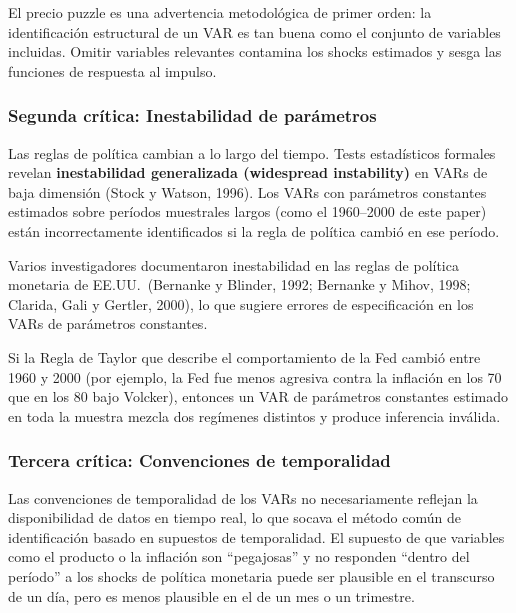 \documentclass[12pt]{article}
\begin{document}
\begin{hallazgo}
El precio puzzle es una advertencia metodol\'ogica de primer orden: la identificaci\'on estructural de un VAR es tan buena como el conjunto de variables incluidas. Omitir variables relevantes contamina los shocks estimados y sesga las funciones de respuesta al impulso.
\end{hallazgo}

\subsubsection{Segunda cr\'itica: Inestabilidad de par\'ametros}

Las reglas de pol\'itica cambian a lo largo del tiempo. Tests estad\'isticos formales revelan \textbf{inestabilidad generalizada (widespread instability)} en VARs de baja dimensi\'on (Stock y Watson, 1996). Los VARs con par\'ametros constantes estimados sobre per\'iodos muestrales largos (como el 1960--2000 de este paper) est\'an incorrectamente identificados si la regla de pol\'itica cambi\'o en ese per\'iodo.

Varios investigadores documentaron inestabilidad en las reglas de pol\'itica monetaria de EE.UU.\ (Bernanke y Blinder, 1992; Bernanke y Mihov, 1998; Clarida, Gali y Gertler, 2000), lo que sugiere errores de especificaci\'on en los VARs de par\'ametros constantes.

\begin{hallazgo}
Si la Regla de Taylor que describe el comportamiento de la Fed cambi\'o entre 1960 y 2000 (por ejemplo, la Fed fue menos agresiva contra la inflaci\'on en los 70 que en los 80 bajo Volcker), entonces un VAR de par\'ametros constantes estimado en toda la muestra mezcla dos reg\'imenes distintos y produce inferencia inv\'alida.
\end{hallazgo}

\subsubsection{Tercera cr\'itica: Convenciones de temporalidad}

Las convenciones de temporalidad de los VARs no necesariamente reflejan la disponibilidad de datos en tiempo real, lo que socava el m\'etodo com\'un de identificaci\'on basado en supuestos de temporalidad. El supuesto de que variables como el producto o la inflaci\'on son ``pegajosas'' y no responden ``dentro del per\'iodo'' a los shocks de pol\'itica monetaria puede ser plausible en el transcurso de un d\'ia, pero es menos plausible en el de un mes o un trimestre.
\end{document}
